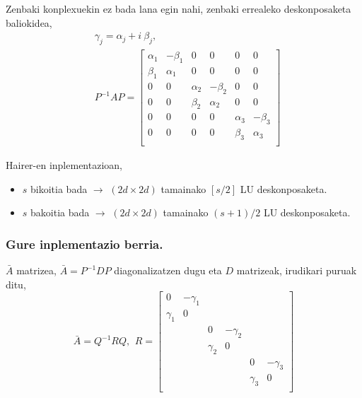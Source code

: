 \begin{enumerate}
Zenbaki konplexuekin ez bada lana egin nahi, zenbaki errealeko deskonposaketa baliokidea,
\begin{align*}
&\gamma_j=\alpha_j + i \ \beta_j,\\
&P^{-1}AP=\begin{bmatrix}
\alpha_{1} & -\beta_{1}   &  0            &  0            &  0           &    0       \\
\beta_{1}  & \alpha_{1}   & 0             &  0            &  0           &    0       \\
 0          & 0             & \alpha_{2}  & -\beta_{2}    &  0           &    0       \\
 0          & 0             & \beta_{2}   & \alpha_{2}    &  0           &    0       \\
 0          & 0             &  0          & 0             & \alpha_{3}  & -\beta_{3}  \\
 0          & 0             &  0          & 0             & \beta_{3}   & \alpha_{3}  \\
\end{bmatrix}
\end{align*}

\end{enumerate}

Hairer-en inplementazioan,
\begin{itemize}
\item $s$ bikoitia bada $\rightarrow$ $(2d \times 2d)$ tamainako $[s/2]$  LU deskonposaketa.
\item $s$ bakoitia bada $\rightarrow$ $(2d \times 2d)$ tamainako $(s+1)/2$  LU deskonposaketa.
\end{itemize}

\subsubsection*{Gure inplementazio berria.}

$\bar{A}$ matrizea, $\bar{A}=P^{-1}DP$ diagonalizatzen dugu eta $D$ matrizeak, irudikari puruak ditu,
\begin{equation*}
\bar{A}=Q^{-1}RQ, \ \,
R=\begin{bmatrix}
0           & -\gamma_{1}   &            &               &             &           \\
 \gamma_{1} & 0             &            &               &             &           \\
            &               & 0           & -\gamma_{2}  &             &           \\
            &               & \gamma_{2}  & 0              &           &           \\
            &               &             &                & 0            & -\gamma_{3} \\
            &               &             &                & \gamma_{3}   & 0            \\
\end{bmatrix}
\end{equation*}

